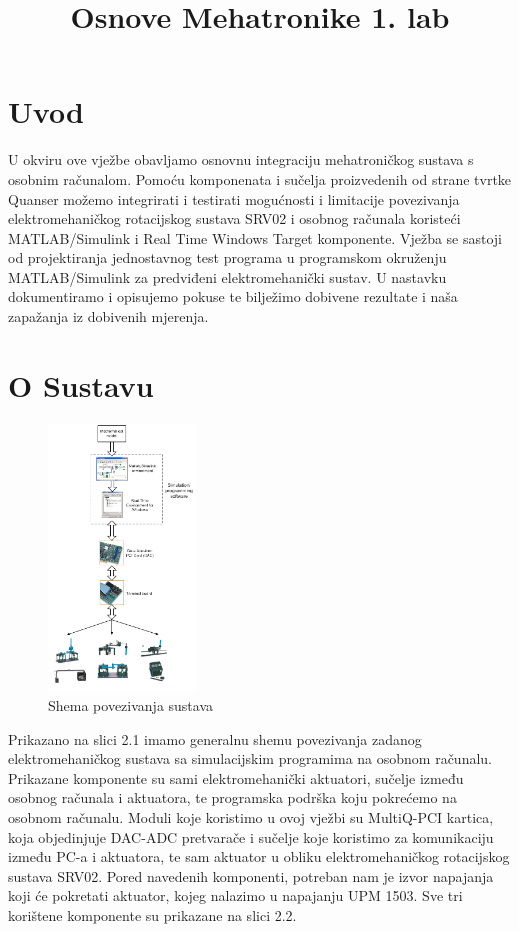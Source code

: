 \documentclass[12pt,a4paper]{article}
\title{Osnove Mehatronike 1. lab}
\begin{document}
\section{Uvod}
U okviru ove vježbe obavljamo osnovnu integraciju mehatroničkog sustava s osobnim računalom. Pomoću komponenata i sučelja proizvedenih od strane tvrtke Quanser možemo integrirati i testirati mogućnosti i limitacije povezivanja elektromehaničkog rotacijskog sustava SRV02 i osobnog računala koristeći MATLAB/Simulink i Real Time Windows Target komponente. Vježba se sastoji od projektiranja jednostavnog test programa u programskom okruženju MATLAB/Simulink za predviđeni elektromehanički sustav. U nastavku dokumentiramo i opisujemo pokuse te bilježimo dobivene rezultate i naša zapažanja iz dobivenih mjerenja.

\newpage

\section{O Sustavu}


\begin{figure}
  	\begin{center}
    \includegraphics[width=0.35\textwidth]{Lab1_final.png}
  	\caption{Shema povezivanja sustava}
 	\end{center}
    \vspace{-25pt}
\end{figure}
Prikazano na slici 2.1 imamo generalnu shemu povezivanja zadanog elektromehaničkog sustava sa simulacijskim programima na osobnom računalu. 
Prikazane komponente su sami elektromehanički aktuatori, sučelje između osobnog računala i aktuatora, te programska podrška koju pokrećemo na osobnom računalu. 
Moduli koje koristimo u ovoj vježbi su MultiQ-PCI kartica, koja objedinjuje DAC-ADC pretvarače i sučelje koje koristimo za komunikaciju između PC-a i aktuatora, te sam aktuator u obliku elektromehaničkog rotacijskog sustava SRV02.
Pored navedenih komponenti, potreban nam je izvor napajanja koji će pokretati aktuator, kojeg nalazimo u napajanju UPM 1503. Sve tri korištene komponente su prikazane na slici 2.2.
\end{document}
